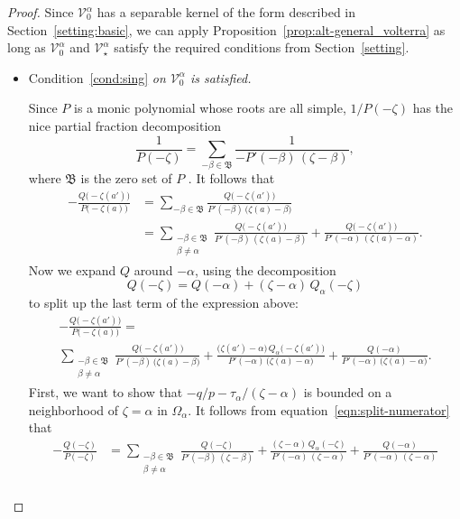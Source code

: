 \documentclass[final]{siamart220329}
\newcommand{\hardpart}{\mathcal{V}_0}
\newcommand{\softpart}{\mathcal{V}_\star}
\newcommand{\roots}{\mathfrak{B}}
\newcommand{\domain}{\Omega}
\begin{document}
\begin{proof}
Since $\hardpart^\alpha$ has a separable kernel of the form described in Section~\ref{setting:basic}, we can apply Proposition~\ref{prop:alt-general_volterra} as long as $\hardpart^\alpha$ and $\softpart^\alpha$ satisfy the required conditions from Section~\ref{setting}.
\begin{itemize}
\item Condition~\eqref{cond:sing} {\em on $\hardpart^\alpha$ is satisfied.}

Since $P$ is a monic polynomial whose roots are all simple, $1/P(-\zeta)$ has the nice partial fraction decomposition
\[ \frac{1}{P(-\zeta)} = \sum_{-\beta \in \roots} \frac{1}{-P'(-\beta)\,(\zeta - \beta)}, \]
where $\roots$ is the zero set of $P$ \cite[Section 1.4, Exercise~2]{ahlfors}. 
It follows that
\begin{align*}
-\frac{Q\big(-\zeta(a')\big)}{P\big(-\zeta(a)\big)} & = \sum_{-\beta \in \roots} \frac{Q\big(-\zeta(a')\big)}{P'(-\beta)\,\big(\zeta(a) - \beta\big)} \\
& = \sum_{\substack{-\beta \in \roots \\ \beta \neq \alpha}} \frac{Q\big(-\zeta(a')\big)}{P'(-\beta)\,(\zeta(a) - \beta)} + \frac{Q\big(-\zeta(a')\big)}{P'(-\alpha)\,(\zeta(a) - \alpha)}.
\end{align*}
Now we expand $Q$ around $-\alpha$, using the decomposition
\[ Q(-\zeta) = Q(-\alpha)+(\zeta-\alpha)\,Q_\alpha(-\zeta) \]
to split up the last term of the expression above:
\begin{multline}\label{eqn:split-numerator}
-\frac{Q\big(-\zeta(a')\big)}{P\big(-\zeta(a)\big)} = \\
\sum_{\substack{-\beta \in \roots \\ \beta \neq \alpha}} \frac{Q\big(-\zeta(a')\big)}{P'(-\beta)\,\big(\zeta(a) - \beta\big)} + \frac{\big(\zeta(a') - \alpha\big)\,Q_\alpha\big(-\zeta(a')\big)}{P'(-\alpha)\,\big(\zeta(a) - \alpha\big)} + \frac{Q(-\alpha)}{P'(-\alpha)\,\big(\zeta(a) - \alpha\big)}.    
\end{multline}
First, we want to show that $-q/p-\tau_\alpha/(\zeta-\alpha)$ is bounded on a neighborhood of $\zeta = \alpha$ in $\domain_\alpha$. It follows from equation~\eqref{eqn:split-numerator} that
\begin{align*}
-\frac{Q(-\zeta)}{P(-\zeta)} & =
\sum_{\substack{-\beta \in \roots \\ \beta \neq \alpha}} \frac{Q(-\zeta)}{P'(-\beta)\,(\zeta - \beta)} + \frac{(\zeta - \alpha)\,Q_\alpha(-\zeta)}{P'(-\alpha)\,(\zeta - \alpha)} + \frac{Q(-\alpha)}{P'(-\alpha)\,(\zeta - \alpha)} \\

\end{align*}
\end{itemize}
\end{proof}
\end{document}
